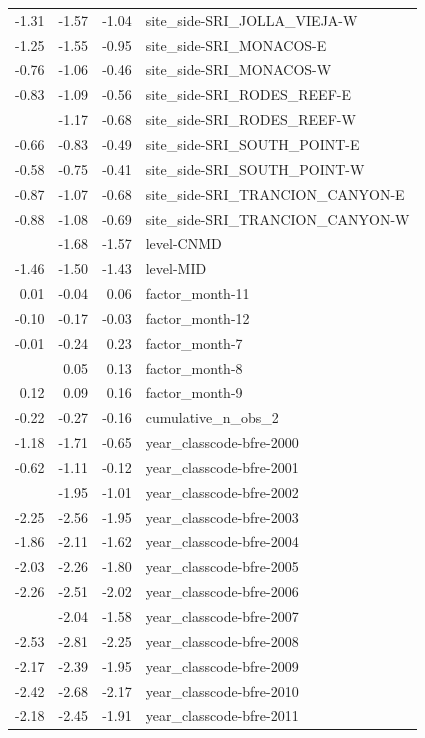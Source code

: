 \documentclass[]{article}
\begin{document}
\begin{longtable}[t]{rrrl}
-1.31 & -1.57 & -1.04 & site\_side-SRI\_JOLLA\_VIEJA-W\\
-1.25 & -1.55 & -0.95 & site\_side-SRI\_MONACOS-E\\
-0.76 & -1.06 & -0.46 & site\_side-SRI\_MONACOS-W\\
-0.83 & -1.09 & -0.56 & site\_side-SRI\_RODES\_REEF-E\\
\addlinespace
-0.92 & -1.17 & -0.68 & site\_side-SRI\_RODES\_REEF-W\\
-0.66 & -0.83 & -0.49 & site\_side-SRI\_SOUTH\_POINT-E\\
-0.58 & -0.75 & -0.41 & site\_side-SRI\_SOUTH\_POINT-W\\
-0.87 & -1.07 & -0.68 & site\_side-SRI\_TRANCION\_CANYON-E\\
-0.88 & -1.08 & -0.69 & site\_side-SRI\_TRANCION\_CANYON-W\\
\addlinespace
-1.63 & -1.68 & -1.57 & level-CNMD\\
-1.46 & -1.50 & -1.43 & level-MID\\
0.01 & -0.04 & 0.06 & factor\_month-11\\
-0.10 & -0.17 & -0.03 & factor\_month-12\\
-0.01 & -0.24 & 0.23 & factor\_month-7\\
\addlinespace
0.09 & 0.05 & 0.13 & factor\_month-8\\
0.12 & 0.09 & 0.16 & factor\_month-9\\
-0.22 & -0.27 & -0.16 & cumulative\_n\_obs\_2\\
-1.18 & -1.71 & -0.65 & year\_classcode-bfre-2000\\
-0.62 & -1.11 & -0.12 & year\_classcode-bfre-2001\\
\addlinespace
-1.48 & -1.95 & -1.01 & year\_classcode-bfre-2002\\
-2.25 & -2.56 & -1.95 & year\_classcode-bfre-2003\\
-1.86 & -2.11 & -1.62 & year\_classcode-bfre-2004\\
-2.03 & -2.26 & -1.80 & year\_classcode-bfre-2005\\
-2.26 & -2.51 & -2.02 & year\_classcode-bfre-2006\\
\addlinespace
-1.81 & -2.04 & -1.58 & year\_classcode-bfre-2007\\
-2.53 & -2.81 & -2.25 & year\_classcode-bfre-2008\\
-2.17 & -2.39 & -1.95 & year\_classcode-bfre-2009\\
-2.42 & -2.68 & -2.17 & year\_classcode-bfre-2010\\
-2.18 & -2.45 & -1.91 & year\_classcode-bfre-2011\\

\end{longtable}
\end{document}
